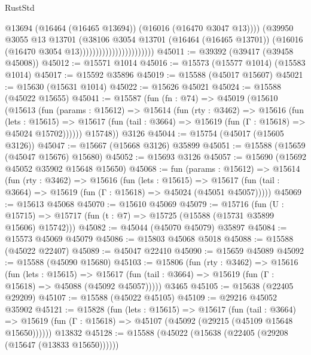 \begin{lexlean}{RustStd}
\begin{coremodule}
                                              @13694
                                              (@16464 (@16465 @13694))
                                              (@16016 (@16470 @3047 @13))))
                                          (@39950
                                            @3055
                                            @13
                                            @13701
                                            (@38106
                                              @3054
                                              @13701
                                              (@16464 (@16465 @13701))
                                              (@16016 (@16470 @3054 @13)))))))))))))))))))))))
@45011 := @39392 (@39417 (@39458 @45008))
@45012 := @15571 @1014
@45016 := @15573 (@15577 @1014) (@15583 @1014)
@45017 := @15592 @35896
@45019 := @15588 (@45017 @15607)
@45021 := @15630 (@15631 @1014)
@45022 := @15626 @45021
@45024 := @15588 (@45022 @15655)
@45041 := @15587
    (fun (fn : @74) =>
    @45019
      (@15610
        (@15613
          (fun (params : @15612) =>
          @15614
            (fun (rty : @3462) =>
            @15616
              (fun (lets : @15615) =>
              @15617 (fun (tail : @3664) => @15619 (fun (Γ : @15618) => @45024 @15702))))))
        @15748))
    @3126
@45044 := @15754 (@45017 (@15605 @3126))
@45047 := @15667 (@15668 @3126) @35899
@45051 := @15588 (@15659 (@45047 @15676) @15680)
@45052 := @15693 @3126
@45057 := @15690 (@15692 @45052 @35902 @15648 @15650)
@45068 := fun (params : @15612) =>
  @15614
    (fun (rty : @3462) =>
    @15616
      (fun (lets : @15615) =>
      @15617 (fun (tail : @3664) => @15619 (fun (Γ : @15618) => @45024 (@45051 @45057)))))
@45069 := @15613 @45068
@45070 := @15610 @45069
@45079 := @15716
    (fun (U : @15715) => @15717 (fun (t : @7) => @15725 (@15588 (@15731 @35899 @15606) @15742)))
@45082 := @45044 (@45070 @45079) @35897
@45084 := @15573 @45069 @45079
@45086 := @15803 @45068 @5018
@45088 := @15588 (@45022 @22407)
@45089 := @45047 @22410
@45090 := @15659 @45089
@45092 := @15588 (@45090 @15680)
@45103 := @15806
    (fun (rty : @3462) =>
    @15616
      (fun (lets : @15615) =>
      @15617 (fun (tail : @3664) => @15619 (fun (Γ : @15618) => @45088 (@45092 @45057)))))
    @3465
@45105 := @15638 (@22405 @29209)
@45107 := @15588 (@45022 @45105)
@45109 := @29216 @45052 @35902
@45121 := @15828
    (fun (lets : @15615) =>
    @15617
      (fun (tail : @3664) =>
      @15619 (fun (Γ : @15618) => @45107 (@45092 (@29215 (@45109 @15648 @15650))))))
    @13832
@45128 := @15588 (@45022 (@15638 (@22405 (@29208 (@15647 (@13833 @15650))))))

\end{coremodule}
\end{lexlean}
